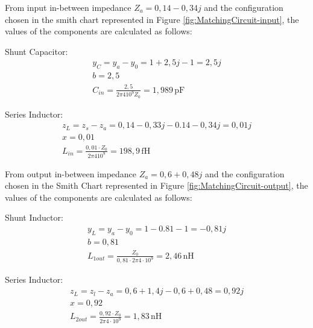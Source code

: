 \vspace{0.4cm}
From input in-between impedance $Z_a = 0,14-0,34j$ and the configuration chosen in the smith chart represented in Figure \ref{fig:MatchingCircuit-input}, the values of the components are calculated as follows:

\vspace{0.4cm}
Shunt Capacitor:
\begin{equation}
    \begin{split}
        y_C =y_a-y_0 = 1+2,5j - 1 = 2,5j\\
        b = 2,5 \\
        C_{in} = \frac{2,5}{2\pi410^9Z_0} = 1,989\,\si{\pico\farad}
    \end{split}
    \label{eq:InputCap}
\end{equation}

Series Inductor:
\begin{equation}
    \begin{split}
        z_L = z_s - z_a = 0,14-0,33j - 0.14 - 0,34j = 0,01j\\
        x = 0,01 \\
        L_{in} = \frac{0,01\cdot Z_0}{2\pi410^9} = 198,9\,\si{\femto\henry}
    \end{split}
    \label{eq:InputInd}
\end{equation}

From output in-between impedance $Z_a = 0,6+0,48j$ and the configuration chosen in the Smith Chart represented in Figure \ref{fig:MatchingCircuit-output}, the values of the components are calculated as follows:

\vspace{0.4cm}
Shunt Inductor:
\begin{equation}
    \begin{split}
        y_L = y_a - y_0 = 1-0.81- 1 = -0,81j\\
        b = 0,81 \\
        L_{1out} = \frac{Z_0}{0,81\cdot2\pi4\cdot10^9} = 2,46\,\si{\nano\henry}
    \end{split}
    \label{eq:OutputIndShunt}
\end{equation}

Series Inductor:
\begin{equation}
    \begin{split}
        z_L = z_l - z_a = 0,6 + 1,4j - 0,6 + 0,48 = 0,92j\\
        x = 0,92 \\
        L_{2out} = \frac{0,92\cdot Z_0}{2\pi4\cdot10^9} = 1,83\,\si{\nano\henry}
    \end{split}
    \label{eq:OutputInd}
\end{equation}

